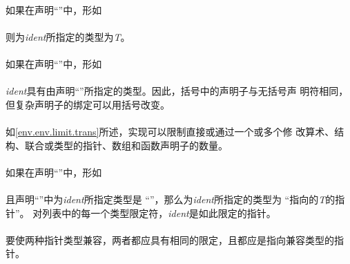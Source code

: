 \paragraph{}
如果在声明``''中，形如                                        \\
\mbox{\hspace{4em}}                                            \\
则为\textit{ident}所指定的类型为\textit{T}。

\paragraph{}
如果在声明``''中，形如                                        \\
\mbox{\hspace{4em}\tm{(}  \tm{)}}                              \\
\textit{ident}具有由声明``''所指定的类型。因此，括号中的声明子与无括号声
明符相同，但复杂声明子的绑定可以用括号改变。

\implimit
\paragraph{}
如\ref{env.env.limit.trans}所述，实现可以限制直接或通过一个或多个修
改算术、结构、联合或类型的指针、数组和函数声明子的数量。


\semantic
\paragraph{}
如果在声明``''中，形如                                        \\
\mbox{\hspace{4em}\tm{*}  }           \\
且声明``''中为\textit{ident}所指定类型是
``''，那么为\textit{ident}所指定的类型为
``指向的\textit{T}的指针''。
对列表中的每一个类型限定符，\textit{ident}是如此限定的指针。

\paragraph{}
要使两种指针类型兼容，两者都应具有相同的限定，且都应是指向兼容类型的指针。

